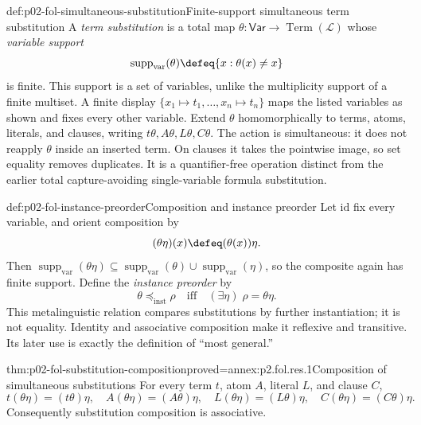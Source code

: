 \begin{hbdefinition}{def:p02-fol-simultaneous-substitution}{Finite-support simultaneous term substitution}
A \emph{term substitution} is a total map
\(\theta:\mathsf{Var}\to\operatorname{Term}(\mathcal L)\) whose
\emph{variable support}
\[
 \operatorname{supp}_{\mathrm{var}}(\theta)
 \defeq\{x:\theta(x)\ne x\}
\]
is finite.  This support is a set of variables, unlike the multiplicity
support of a finite multiset.  A finite display
\(\{x_1\mapsto t_1,\ldots,x_n\mapsto t_n\}\) maps the listed variables as
shown and fixes every other variable.  Extend \(\theta\) homomorphically to
terms, atoms, literals, and clauses, writing
\(t\theta,A\theta,L\theta,C\theta\).
The action is simultaneous: it does not reapply \(\theta\) inside an inserted
term.  On clauses it takes the pointwise image, so set equality removes
duplicates.  It is a quantifier-free operation distinct from the earlier
total capture-avoiding single-variable formula substitution.
\end{hbdefinition}

\begin{hbdefinition}{def:p02-fol-instance-preorder}{Composition and instance preorder}
Let \(\mathrm{id}\) fix every variable, and orient composition by
\[
 (\theta\eta)(x)\defeq(\theta(x))\eta.
\]
Then
\(\operatorname{supp}_{\mathrm{var}}(\theta\eta)\subseteq
  \operatorname{supp}_{\mathrm{var}}(\theta)
  \cup\operatorname{supp}_{\mathrm{var}}(\eta)\),
so the composite again has finite support.
Define the \emph{instance preorder} by
\[
 \theta\preceq_{\mathrm{inst}}\rho
 \quad\text{iff}\quad
 (\exists\eta)\;\rho=\theta\eta.
\]
This metalinguistic relation compares substitutions by further
instantiation; it is not equality.  Identity and associative composition make
it reflexive and transitive.  Its later use is exactly the definition of
``most general.''
\end{hbdefinition}

\begin{hblemma}{thm:p02-fol-substitution-composition}{proved=annex:p2.fol.res.1}{Composition of simultaneous substitutions}
For every term \(t\), atom \(A\), literal \(L\), and clause \(C\),
\[
 t(\theta\eta)=(t\theta)\eta,
 \quad A(\theta\eta)=(A\theta)\eta,
 \quad L(\theta\eta)=(L\theta)\eta,
 \quad C(\theta\eta)=(C\theta)\eta.
\]
Consequently substitution composition is associative.
\end{hblemma}


